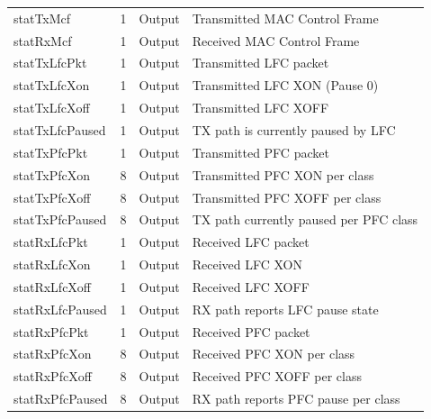 \begin{longtable}[H]{
    | p{}
    | p{}
    | p{}
    | p{} |
  }
  \rowcolor{fog-grey} \multicolumn{4}{|l|}{\textbf{Control Frame Statistics}} \\ \hline
  statTxMcf          & 1              & Output & Transmitted MAC Control Frame \\ \hline
  statRxMcf          & 1              & Output & Received MAC Control Frame \\ \hline
  statTxLfcPkt       & 1              & Output & Transmitted LFC packet \\ \hline
  statTxLfcXon       & 1              & Output & Transmitted LFC XON (Pause 0) \\ \hline
  statTxLfcXoff      & 1              & Output & Transmitted LFC XOFF \\ \hline
  statTxLfcPaused    & 1              & Output & TX path is currently paused by LFC \\ \hline
  statTxPfcPkt       & 1              & Output & Transmitted PFC packet \\ \hline
  statTxPfcXon       & 8              & Output & Transmitted PFC XON per class \\ \hline
  statTxPfcXoff      & 8              & Output & Transmitted PFC XOFF per class \\ \hline
  statTxPfcPaused    & 8              & Output & TX path currently paused per PFC class \\ \hline
  statRxLfcPkt       & 1              & Output & Received LFC packet \\ \hline
  statRxLfcXon       & 1              & Output & Received LFC XON \\ \hline
  statRxLfcXoff      & 1              & Output & Received LFC XOFF \\ \hline
  statRxLfcPaused    & 1              & Output & RX path reports LFC pause state \\ \hline
  statRxPfcPkt       & 1              & Output & Received PFC packet \\ \hline
  statRxPfcXon       & 8              & Output & Received PFC XON per class \\ \hline
  statRxPfcXoff      & 8              & Output & Received PFC XOFF per class \\ \hline
  statRxPfcPaused    & 8              & Output & RX path reports PFC pause per class \\ \hline


\end{longtable}
